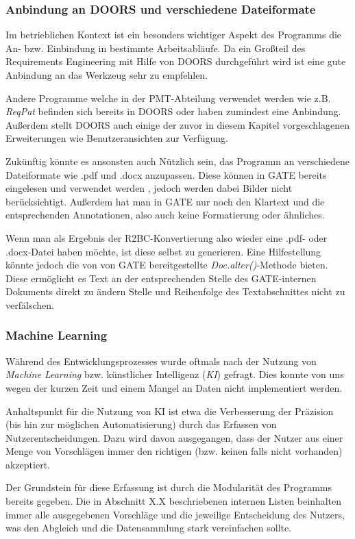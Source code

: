 \documentclass[12pt]{report}
\begin{document}
\subsubsection{Anbindung an DOORS und verschiedene Dateiformate}
Im betrieblichen Kontext ist ein besonders wichtiger Aspekt des Programms die An- bzw. Einbindung in bestimmte Arbeitsabläufe. Da ein Großteil des Requirements Engineering mit Hilfe von DOORS durchgeführt wird ist eine gute Anbindung an das Werkzeug sehr zu empfehlen. 

Andere Programme welche in der PMT-Abteilung verwendet werden wie z.B. \textit{ReqPat} befinden sich bereits in DOORS oder haben zumindest eine Anbindung. Außerdem stellt DOORS auch einige der zuvor in diesem Kapitel vorgeschlagenen Erweiterungen wie Benutzeransichten zur Verfügung. 

Zukünftig könnte es ansonsten auch Nützlich sein, das Programm an verschiedene Dateiformate wie .pdf und .docx anzupassen. Diese können in GATE bereits eingelesen und verwendet werden \cite{rs18}, jedoch werden dabei Bilder nicht berücksichtigt. Außerdem hat man in GATE nur noch den Klartext und die entsprechenden Annotationen, also auch keine Formatierung oder ähnliches. 

Wenn man als Ergebnis der R2BC-Konvertierung also wieder eine .pdf- oder .docx-Datei haben möchte, ist diese selbst zu generieren. Eine Hilfestellung könnte jedoch die von von GATE bereitgestellte \textit{Doc.alter()}-Methode bieten. Diese ermöglicht es Text an der entsprechenden Stelle des GATE-internen Dokuments direkt zu ändern Stelle und Reihenfolge des Textabschnittes nicht zu verfälschen.
\subsubsection{Machine Learning}
Während des Entwicklungsprozesses wurde oftmals nach der Nutzung von \textit{Machine Learning} bzw. künstlicher Intelligenz (\textit{KI}) gefragt. Dies konnte von uns wegen der kurzen Zeit und einem Mangel an Daten nicht implementiert werden. 

Anhaltspunkt für die Nutzung von KI ist etwa die Verbesserung der Präzision (bis hin zur möglichen Automatisierung) durch das Erfassen von Nutzerentscheidungen. Dazu wird davon ausgegangen, dass der Nutzer aus einer Menge von Vorschlägen immer den richtigen (bzw. keinen falls nicht vorhanden) akzeptiert. 

Der Grundstein für diese Erfassung ist durch die Modularität des Programms bereits gegeben. Die in Abschnitt X.X beschriebenen internen Listen beinhalten immer alle ausgegebenen Vorschläge und die jeweilige Entscheidung des Nutzers, was den Abgleich und die Datensammlung stark vereinfachen sollte. 
\end{document}
